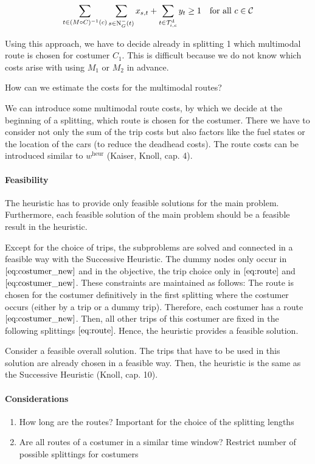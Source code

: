 \begin{align}
\label{eq:costumer_new}
	\sum_{t\in(M\circ C)^{-1}(c)} \sum_{s\in\operatorname{N}_G^-(t)} x_{s,t} + \sum_{t\in\mathcal{T}^{\operatorname{d}}_{i,c}} y_t \geq 1 & & \text{for all } c\in\mathcal{C}
\end{align}

Using this approach, we have to decide already in splitting 1 which multimodal route is chosen for costumer $C_1$. This is difficult because we do not know which costs arise with using $M_1$ or $M_2$ in advance.

\begin{question}

How can we estimate the costs for the multimodal routes?

\end{question}

We can introduce some multimodal route costs, by which we decide at the beginning of a splitting, which route is chosen for the costumer. There we have to consider not only the sum of the trip costs but also factors like the fuel states or the location of the cars (to reduce the deadhead costs). The route costs can be introduced similar to $w^{\operatorname{heur}}$ (Kaiser, Knoll, cap. 4).

\paragraph{Feasibility} \parfill

The heuristic has to provide only feasible solutions for the main problem. Furthermore, each feasible solution of the main problem should be a feasible result in the heuristic. 

Except for the choice of trips, the subproblems are solved and connected in a feasible way with the Successive Heuristic. The dummy nodes only occur in $\eqref{eq:costumer_new}$ and in the objective, the trip choice only in $\eqref{eq:route}$ and $\eqref{eq:costumer_new}$. These constraints are maintained as follows: The route is chosen for the costumer definitively in the first splitting where the costumer occurs (either by a trip or a dummy trip). Therefore, each costumer has a route $\eqref{eq:costumer_new}$. Then, all other trips of this costumer are fixed in the following splittings $\eqref{eq:route}$. Hence, the heuristic provides a feasible solution. 

Consider a feasible overall solution. The trips that have to be used in this solution are already chosen in a feasible way. Then, the heuristic is the same as the Successive Heuristic (Knoll, cap. 10).

\paragraph{Considerations}

\begin{enumerate}
	\item{How long are the routes? Important for the choice of the splitting lengths}
	\item{Are all routes of a costumer in a similar time window? Restrict number of possible splittings for costumers}
\end{enumerate}